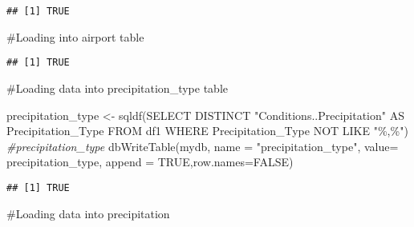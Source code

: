 \documentclass[
]{article}
\newenvironment{Shaded}{\begin{snugshade}}{\end{snugshade}}
\newcommand{\AttributeTok}[1]{\textcolor[rgb]{0.77,0.63,0.00}{#1}}
\newcommand{\CommentTok}[1]{\textcolor[rgb]{0.56,0.35,0.01}{\textit{#1}}}
\newcommand{\ConstantTok}[1]{\textcolor[rgb]{0.00,0.00,0.00}{#1}}
\newcommand{\FunctionTok}[1]{\textcolor[rgb]{0.00,0.00,0.00}{#1}}
\newcommand{\NormalTok}[1]{#1}
\newcommand{\OtherTok}[1]{\textcolor[rgb]{0.56,0.35,0.01}{#1}}
\newcommand{\StringTok}[1]{\textcolor[rgb]{0.31,0.60,0.02}{#1}}
\begin{document}
\begin{verbatim}
## [1] TRUE
\end{verbatim}

\#Loading into airport table

\begin{Shaded}
\end{Shaded}

\begin{verbatim}
## [1] TRUE
\end{verbatim}

\#Loading data into precipitation\_type table

\begin{Shaded}
\begin{Highlighting}[]
\NormalTok{precipitation\_type }\OtherTok{\textless{}{-}} \FunctionTok{sqldf}\NormalTok{(}\StringTok{\textquotesingle{}SELECT DISTINCT "Conditions..Precipitation" AS Precipitation\_Type }
\StringTok{                            FROM df1 }
\StringTok{                            WHERE Precipitation\_Type NOT LIKE "\%,\%"\textquotesingle{}}\NormalTok{)}
\CommentTok{\#precipitation\_type}
\FunctionTok{dbWriteTable}\NormalTok{(mydb, }\AttributeTok{name =} \StringTok{"precipitation\_type"}\NormalTok{, }\AttributeTok{value=}\NormalTok{ precipitation\_type, }\AttributeTok{append =} \ConstantTok{TRUE}\NormalTok{,}\AttributeTok{row.names=}\ConstantTok{FALSE}\NormalTok{)}
\end{Highlighting}
\end{Shaded}

\begin{verbatim}
## [1] TRUE
\end{verbatim}

\#Loading data into precipitation
\end{document}

